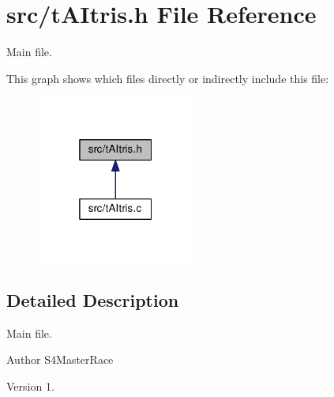 \section{src/t\+A\+Itris.h File Reference}
\label{tAItris_8h}


Main file.  


This graph shows which files directly or indirectly include this file\+:\nopagebreak
\begin{figure}[H]
\begin{center}
\leavevmode
\includegraphics[width=148pt]{tAItris_8h__dep__incl}
\end{center}
\end{figure}


\subsection{Detailed Description}
Main file. 

\begin{DoxyAuthor}{Author}
S4\+Master\+Race 
\end{DoxyAuthor}
\begin{DoxyVersion}{Version}
1. 
\end{DoxyVersion}
